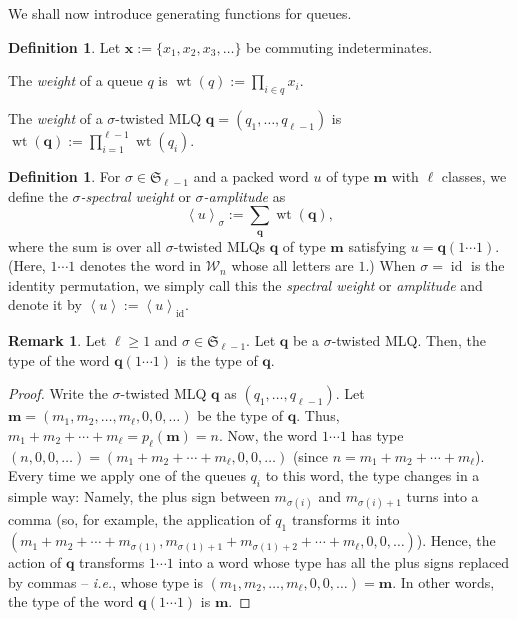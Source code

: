 \documentclass[reqno]{amsart}%
\newcommand{\0}{\phantom{c}}
\DeclareMathOperator{\wt}{wt}
\DeclareMathOperator{\id}{id}
\let\sumnonlimits\sum
\let\prodnonlimits\prod
\renewcommand{\sum}{\sumnonlimits\limits}
\renewcommand{\prod}{\prodnonlimits\limits}
\theoremstyle{plain}
\theoremstyle{definition}
\newtheorem{dfn}[thm]{Definition}
\newtheorem{remark}[thm]{Remark}
\numberwithin{equation}{section}
\begin{document}
We shall now introduce generating functions for queues.

\begin{dfn}
Let $\mathbf{x} := \{x_{1}, x_{2}, x_{3}, \ldots\}$ be commuting indeterminates.

The {\color{darkred}\emph{weight}} of a queue $q$ is $\wt(q) := \prod_{i \in
q} x_{i}$.

The {\color{darkred}\emph{weight}} of a $\sigma$-twisted MLQ $\mathbf{q} =
(q_{1}, \dotsc, q_{\ell-1})$ is $\wt(\mathbf{q}) := \prod_{i=1}^{\ell-1}
\wt(q_{i})$.
\end{dfn}

\begin{dfn}
For $\sigma\in\mathfrak{S}_{\ell-1}$ and a packed word $u$ of type
$\mathbf{m}$ with $\ell$ classes, we define the {\color{darkred}\emph{$\sigma
$-spectral weight}} or {\color{darkred}\emph{$\sigma$-amplitude}} as
\begin{equation}
\label{eq:amplitude}\left\langle u \right\rangle _{\sigma} := \sum
_{\mathbf{q}} \wt(\mathbf{q}),
\end{equation}
where the sum is over all $\sigma$-twisted MLQs $\mathbf{q}$ of type
$\mathbf{m}$ satisfying $u = \mathbf{q}(1 \dotsm1)$. (Here, $1 \dotsm1$
denotes the word in $\mathcal{W}_{n}$ whose all letters are $1$.) When
$\sigma= \id$ is the identity permutation, we simply call this the
{\color{darkred}\emph{spectral weight}} or {\color{darkred}\emph{amplitude}}
and denote it by $\left\langle u \right\rangle := \left\langle u \right\rangle
_{\id}$.
\end{dfn}

\begin{remark}
\label{rmk:mlq-type} Let $\ell\geq1$ and $\sigma\in\mathfrak{S}_{\ell-1}$. Let
$\mathbf{q}$ be a $\sigma$-twisted MLQ. Then, the type of the word
$\mathbf{q}(1 \dotsm1)$ is the type of $\mathbf{q}$.
\end{remark}

\begin{proof}
Write the $\sigma$-twisted MLQ $\mathbf{q}$ as $\left(  q_{1}, \ldots,
q_{\ell-1} \right)  $. Let $\mathbf{m} = \left(  m_{1}, m_{2}, \ldots,
m_{\ell}, 0, 0, \ldots\right)  $ be the type of $\mathbf{q}$. Thus, $m_{1} +
m_{2} + \cdots+ m_{\ell}= p_{\ell}(\mathbf{m}) = n$. Now, the word $1 \dotsm1$
has type $\left(  n, 0, 0, \ldots\right)  = \left(  m_{1} + m_{2} + \cdots+
m_{\ell}, 0, 0, \ldots\right)  $ (since $n = m_{1} + m_{2} + \cdots+ m_{\ell}%
$). Every time we apply one of the queues $q_{i}$ to this word, the type
changes in a simple way: Namely, the plus sign between $m_{\sigma(i)}$ and
$m_{\sigma(i)+1}$ turns into a comma (so, for example, the application of
$q_{1}$ transforms it into $\left(  m_{1} + m_{2} + \cdots+ m_{\sigma(1)},
m_{\sigma(1)+1} + m_{\sigma(1)+2} + \cdots+ m_{\ell}, 0, 0, \ldots\right)  $).
Hence, the action of $\mathbf{q}$ transforms $1 \dotsm1$ into a word whose
type has all the plus signs replaced by commas -- \textit{i.e.}, whose type is
$\left(  m_{1}, m_{2}, \ldots, m_{\ell}, 0, 0, \ldots\right)  = \mathbf{m}$.
In other words, the type of the word $\mathbf{q}(1 \dotsm1)$ is $\mathbf{m}$.
\end{proof}
\end{document}

